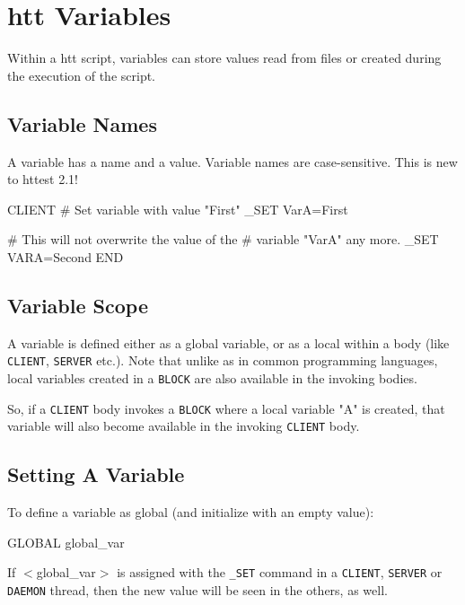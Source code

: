 \chapter{htt Variables}
\label{chap:variables}

Within a htt script, variables can store values read from files 
or created during the execution of the script.

\section{Variable Names}

A variable has a name and a value. Variable names are 
case-sensitive. This is new to httest 2.1!

\begin{usplisting}
    CLIENT
    # Set variable with value "First"
    _SET VarA=First
    
    # This will not overwrite the value of the 
    # variable "VarA" any more.
    _SET VARA=Second
    END
\end{usplisting}

\section{Variable Scope}

A variable is defined either as a global variable, or as a local within 
a body (like \texttt{CLIENT}, \texttt{SERVER} etc.). Note that unlike as in  
common programming languages, local variables created in a \texttt{BLOCK} 
are also available in the invoking bodies.

So, if a \texttt{CLIENT} body invokes a \texttt{BLOCK} where a local variable "A" 
is created, that variable will also become available in the invoking \texttt{CLIENT} 
body.

\newpage
\section{Setting A Variable} 

To define a variable as global (and initialize with an empty value):

\begin{usplisting}
    GLOBAL global_var
\end{usplisting}
If $<$global\_var$>$ is assigned with the \texttt{\_SET} command in a \texttt{CLIENT},
\texttt{SERVER} or \texttt{DAEMON} thread, then the new value will be seen in
the others, as well.

